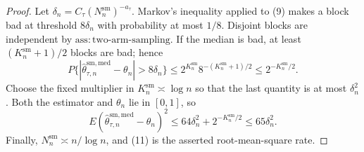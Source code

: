 \documentclass{article}
\begin{document}
\begin{proof}
Let \(\delta_n=C_\tau(N_n^{\mathrm{sm}})^{-a_\tau}\). Markov's inequality applied to (9) makes a block bad at threshold \(8\delta_n\) with probability at most \(1/8\). Disjoint blocks are independent by \(\mathrm{ass{:}two\text{-}arm\text{-}sampling}\). If the median is bad, at least \((K_n^{\mathrm{sm}}+1)/2\) blocks are bad; hence
\[
P\{|\widehat\theta^{\mathrm{sm,med}}_{\tau,n}-\theta_n|>8\delta_n\}
\le2^{K_n^{\mathrm{sm}}}8^{-(K_n^{\mathrm{sm}}+1)/2}
\le2^{-K_n^{\mathrm{sm}}/2}.                                      \tag{10}
\]
Choose the fixed multiplier in \(K_n^{\mathrm{sm}}\asymp\log n\) so that the last quantity is at most \(\delta_n^2\). Both the estimator and \(\theta_n\) lie in \([0,1]\), so
\[
E(\widehat\theta^{\mathrm{sm,med}}_{\tau,n}-\theta_n)^2
\le64\delta_n^2+2^{-K_n^{\mathrm{sm}}/2}
\le65\delta_n^2.                                                   \tag{11}
\]
Finally, \(N_n^{\mathrm{sm}}\asymp n/\log n\), and (11) is the asserted root-mean-square rate.
\end{proof}
\end{document}
